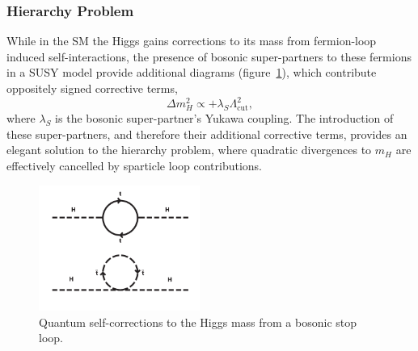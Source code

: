\subsubsection{Hierarchy Problem}
While in the SM the Higgs gains corrections to its mass from fermion-loop
induced self-interactions, the presence of bosonic super-partners to these
fermions in a SUSY model provide additional diagrams (figure~\ref{fig:quantum_higgs_sboson_loop}),
which contribute oppositely signed corrective terms,
% 
\begin{equation}
\Delta m_H^2 \propto + \lambda_S \Lambda_{\text{cut}}^2 ,
\end{equation}
% 
where $\lambda_S$ is the bosonic super-partner's Yukawa coupling. The introduction
of these super-partners, and therefore their additional corrective terms,
provides an elegant solution to the hierarchy problem, where quadratic
divergences to $m_H$ are effectively cancelled by sparticle loop contributions.

\begin{figure}[ht!]
\centering
\includegraphics[width=0.47\textwidth,trim=0 0 0 250, clip=true]
{Figs/feynman/600px-Hqmc-vector.png}
\caption{Quantum self-corrections to the Higgs mass from a bosonic stop
loop.}
\label{fig:quantum_higgs_sboson_loop}
\end{figure}

